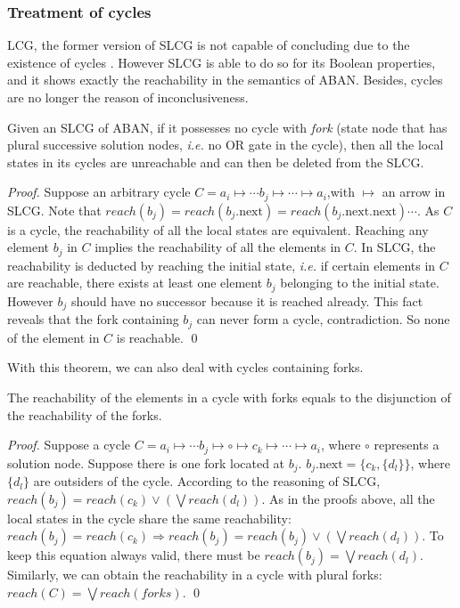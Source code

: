 \documentclass[runningheads]{llncs}
\begin{document}
\subsubsection{Treatment of cycles}
LCG, the former version of SLCG is not capable of concluding due to the existence of cycles \cite{folschette2015}. However SLCG is able to do so for its Boolean properties, and it shows exactly the reachability in the semantics of ABAN. Besides, cycles are no longer the reason of inconclusiveness.

\begin{theorem}\label{cycletheo}
Given an SLCG of ABAN, if it possesses no cycle with \textit{fork} (state node that has plural successive solution nodes, \textit{i.e.} no OR gate in the cycle), then all the local states in its cycles are unreachable and can then be deleted from the SLCG.
\end{theorem}

\begin{proof}
Suppose an arbitrary cycle $C=a_i\mapsto \cdots b_j\mapsto\cdots \mapsto a_i$,with $\mapsto$ an arrow in SLCG. Note that $reach(b_j)=reach(b_j.\text{next})=reach(b_j.\text{next}.\text{next})\cdots$. As $C$ is a cycle, the reachability of all the local states are equivalent. Reaching any element $b_j$ in $C$ implies the reachability of all the elements in $C$. In SLCG, the reachability is deducted by reaching the initial state, \textit{i.e.} if certain elements in $C$ are reachable, there exists at least one element $b_j$ belonging to the initial state. However $b_j$ should have no successor because it is reached already. This fact reveals that the fork containing $b_j$ can never form a cycle, contradiction. So none of the element in $C$ is reachable.
\qed\end{proof}

With this theorem, we can also deal with cycles containing forks. 
\begin{lemma}\label{cyclelem}
The reachability of the elements in a cycle with forks equals to the disjunction of the reachability of the forks.
\end{lemma}

\begin{proof}
Suppose a cycle $C=a_i\mapsto \cdots b_j\mapsto \circ\mapsto c_k \mapsto\cdots \mapsto a_i$, where $\circ$ represents a solution node. Suppose there is one fork located at $b_j$. $b_j.\text{next}=\{c_k,\{d_l\}\}$, where $\{d_l\}$ are outsiders of the cycle. According to the reasoning of SLCG, $reach (b_j)=reach (c_k)\lor (\bigvee reach (d_{l}))$. As in the proofs above, all the local states in the cycle share the same reachability: $reach (b_j)=reach (c_k)\Rightarrow reach (b_j)=reach (b_j)\lor (\bigvee reach (d_{l}))$. To keep this equation always valid, there must be $reach (b_j)=\bigvee reach (d_{l})$. Similarly, we can obtain the reachability in a cycle with plural forks: $reach (C)=\bigvee reach (forks)$.
\qed\end{proof}
\end{document}
